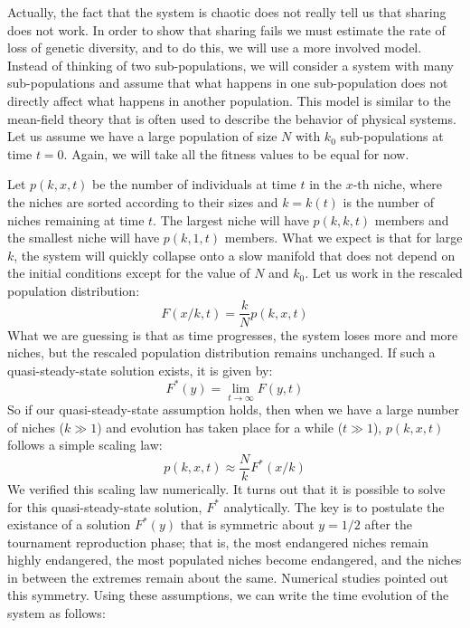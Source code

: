 Actually, the fact that the system is chaotic does not really tell us that
sharing does not work.  In order to show that sharing fails we must estimate
the rate of loss of genetic diversity, and to do this, we will use a more
involved model.  Instead of thinking of two sub-populations, we will consider
a system with many sub-populations and assume that what happens in one
sub-population does not directly affect what happens in another population.
This model is similar to the mean-field theory that is often used to describe
the behavior of physical systems.  Let us assume we have a large population
of size $N$ with $k_0$ sub-populations at time $t=0$.  
Again, we will take all the fitness values to be equal for now.

Let $p(k,x,t)$ be the number of individuals at
time $t$ in the $x$-th niche, where the
niches are sorted according to their sizes and $k=k(t)$ is the number of
niches remaining at time $t$.  The largest niche will have
$p(k,k,t)$ members and the smallest niche will have $p(k,1,t)$ members.  What we
expect is that for large $k$, the system will quickly collapse onto
a slow manifold that does not depend on the initial conditions except for
the value of $N$ and $k_0$.
Let us work in the rescaled population distribution:
\begin{equation}
F(x/k,t)=\frac{k}{N} p(k,x,t)
\end{equation}
What we are guessing is that as time progresses, the system loses more and
more niches, but the rescaled population distribution remains unchanged.
If such a quasi-steady-state solution exists, it is given by:
\begin{equation}
F^*(y)=\lim_{t \rightarrow \infty} F(y,t)
\end{equation}
So if our quasi-steady-state assumption holds, then
when we have a large number of niches ($k \gg 1$)
and evolution has taken place for a while ($t \gg 1$), 
$p(k,x,t)$ follows a simple scaling law:
\begin{equation}
p(k,x,t) \approx \frac{N}{k} F^*(x/k)
\end{equation}
We verified this scaling law numerically.  It turns out that it is possible
to solve for this quasi-steady-state solution, $F^*$ analytically.
The key is to postulate the existance of a solution $F^*(y)$
that is symmetric about $y=1/2$ after the tournament reproduction phase; that is, the
most endangered niches remain highly endangered, the most populated
niches become endangered, and the niches in between the extremes
remain about the same.  Numerical studies pointed out this symmetry.
Using these assumptions, we can write the time evolution of the system
as follows:

